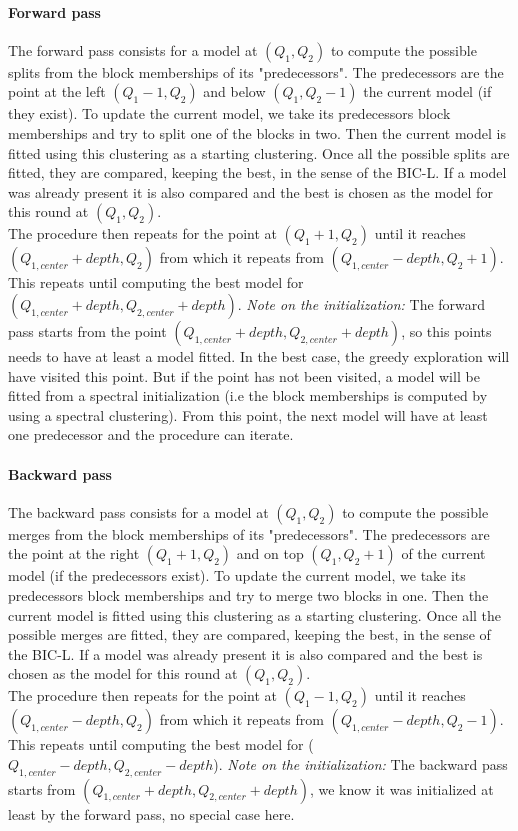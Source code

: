 \documentclass[12pt,a4paper]{report}
\begin{document}
\paragraph*{Forward pass} The forward pass consists for a model at $(Q_1, Q_2)$ 
to compute the possible splits from the block memberships of its "predecessors". 
The predecessors are the point at the left $(Q_1 - 1, Q_2)$ and below 
$(Q_1, Q_2 - 1)$ the current model (if they exist). To update the current model,
we take its predecessors block memberships and try to split one of the blocks in
two. Then the current model is fitted using this clustering as a starting 
clustering. Once all the possible splits are fitted, they are compared, keeping 
the best, in the sense of the BIC-L. If a model was already present it is also
compared and the best is chosen as the model for this round at $(Q_1, Q_2)$.\\
The procedure then repeats for the point at $(Q_1 + 1, Q_2)$ until it reaches 
$(Q_{1,center} + depth, Q_2)$ from which it repeats from 
$(Q_{1,center} - depth, Q_2 + 1)$. This repeats until computing the best model
for $(Q_{1,center} + depth, Q_{2,center} + depth)$.
\textit{Note on the initialization:} The forward pass starts from the point 
$(Q_{1,center} + depth, Q_{2,center} + depth)$, so this points needs to have at 
least a model fitted. In the best case, the greedy exploration will have visited
this point. But if the point has not been visited, a model will be fitted from
a spectral initialization (i.e the block memberships is computed by using a 
spectral clustering). From this point, the next model will have at least one
predecessor and the procedure can iterate.

\paragraph*{Backward pass} The backward pass consists for a model at $(Q_1, Q_2)$ 
to compute the possible merges from the block memberships of its "predecessors". 
The predecessors are the point at the right $(Q_1 + 1, Q_2)$ and on top 
$(Q_1, Q_2 + 1)$ of the current model (if the predecessors exist). To update the
current model, we take its predecessors block memberships and try to merge two 
blocks in one. Then the current model is fitted using this clustering as
a starting clustering. Once all the possible merges are fitted, they are
compared, keeping the best, in the sense of the BIC-L.
If a model was already present it is also
compared and the best is chosen as the model for this round at $(Q_1, Q_2)$.\\
The procedure then repeats for the point at $(Q_1 - 1, Q_2)$ until it reaches 
$(Q_{1,center} - depth, Q_2)$ from which it repeats from 
$(Q_{1,center} - depth, Q_2 - 1)$. This repeats until computing the best model
for ($Q_{1,center} - depth, Q_{2,center} - depth$).
\textit{Note on the initialization:} The backward pass starts from
$(Q_{1,center} + depth, Q_{2,center} + depth)$, we know it was initialized at
least by the forward pass, no special case here.\\
\end{document}
